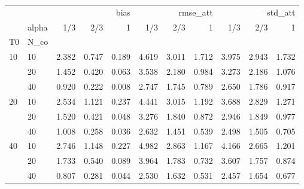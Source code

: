 \begin{tabular}{llrrrrrrrrr}
\toprule
 &  & \multicolumn{3}{r}{bias} & \multicolumn{3}{r}{rmse_att} & \multicolumn{3}{r}{std_att} \\
 & alpha & 1/3 & 2/3 & 1 & 1/3 & 2/3 & 1 & 1/3 & 2/3 & 1 \\
T0 & N_co &  &  &  &  &  &  &  &  &  \\
\midrule
\multirow[t]{3}{*}{10} & 10 & 2.382 & 0.747 & 0.189 & 4.619 & 3.011 & 1.712 & 3.975 & 2.943 & 1.732 \\
 & 20 & 1.452 & 0.420 & 0.063 & 3.538 & 2.180 & 0.984 & 3.273 & 2.186 & 1.076 \\
 & 40 & 0.920 & 0.222 & 0.008 & 2.747 & 1.745 & 0.789 & 2.650 & 1.786 & 0.917 \\
\cline{1-11}
\multirow[t]{3}{*}{20} & 10 & 2.534 & 1.121 & 0.237 & 4.441 & 3.015 & 1.192 & 3.688 & 2.829 & 1.271 \\
 & 20 & 1.520 & 0.421 & 0.048 & 3.276 & 1.840 & 0.872 & 2.946 & 1.849 & 0.977 \\
 & 40 & 1.008 & 0.258 & 0.036 & 2.632 & 1.451 & 0.539 & 2.498 & 1.505 & 0.705 \\
\cline{1-11}
\multirow[t]{3}{*}{40} & 10 & 2.746 & 1.148 & 0.227 & 4.982 & 2.863 & 1.167 & 4.166 & 2.665 & 1.201 \\
 & 20 & 1.733 & 0.540 & 0.089 & 3.964 & 1.783 & 0.732 & 3.607 & 1.757 & 0.874 \\
 & 40 & 0.807 & 0.281 & 0.044 & 2.530 & 1.632 & 0.531 & 2.457 & 1.654 & 0.677 \\
\cline{1-11}
\bottomrule
\end{tabular}
